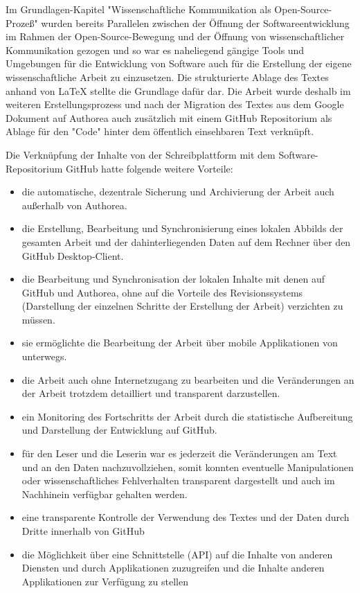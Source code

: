 Im Grundlagen-Kapitel "Wissenschaftliche Kommunikation als Open-Source-Prozeß" wurden bereits Parallelen zwischen der Öffnung der Softwareentwicklung im Rahmen der Open-Source-Bewegung und der Öffnung von wissenschaftlicher Kommunikation gezogen und so war es naheliegend gängige Tools und Umgebungen für die Entwicklung von Software auch für die Erstellung der eigene wissenschaftliche Arbeit zu einzusetzen. Die strukturierte Ablage des Textes anhand von LaTeX stellte die Grundlage dafür dar. Die Arbeit wurde deshalb im weiteren Erstellungsprozess und nach der Migration des Textes aus dem Google Dokument auf Authorea auch zusätzlich mit einem GitHub Repositorium als Ablage für den "Code" hinter dem öffentlich einsehbaren Text verknüpft.

Die Verknüpfung der Inhalte von der Schreibplattform mit dem Software-Repositorium GitHub hatte folgende weitere Vorteile:
\begin{itemize}
\item die automatische, dezentrale Sicherung und Archivierung der Arbeit auch außerhalb von Authorea.
\item die Erstellung, Bearbeitung und Synchronisierung eines lokalen Abbilds der gesamten Arbeit und der dahinterliegenden Daten auf dem Rechner über den GitHub Desktop-Client.
\item die Bearbeitung und Synchronisation der lokalen Inhalte mit denen auf GitHub und Authorea, ohne auf die Vorteile des Revisionssystems (Darstellung der einzelnen Schritte der Erstellung der Arbeit) verzichten zu müssen.
\item sie ermöglichte die Bearbeitung der Arbeit über mobile Applikationen von unterwegs.
\item die Arbeit auch ohne Internetzugang zu bearbeiten und die Veränderungen an der Arbeit trotzdem detailliert und transparent darzustellen.
\item ein Monitoring des Fortschritts der Arbeit durch die statistische Aufbereitung und Darstellung der Entwicklung auf GitHub.
\item für den Leser und die Leserin war es jederzeit die Veränderungen am Text und an den Daten nachzuvollziehen, somit konnten eventuelle Manipulationen oder wissenschaftliches Fehlverhalten transparent dargestellt und auch im Nachhinein verfügbar gehalten werden.
\item eine transparente Kontrolle der Verwendung des Textes und der Daten durch Dritte innerhalb von GitHub
\item die Möglichkeit über eine Schnittstelle (API) auf die Inhalte von anderen Diensten und durch Applikationen zuzugreifen und die Inhalte anderen Applikationen zur Verfügung zu stellen
\end{itemize}

